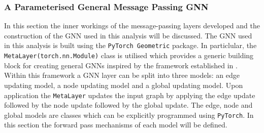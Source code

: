 \subsubsection{A Parameterised General Message Passing GNN}

In this section the inner workings of the message-passing layers developed and the construction of the GNN used in this analysis will be discussed. The GNN used in this analysis is built using the \texttt{PyTorch Geometric} package. In particlular, the \texttt{MetaLayer(torch.nn.Module)} class is utilised which provides a generic building block for creating general GNNs inspired by the framework established in \cite{https://doi.org/10.48550/arxiv.1806.01261}. Within this framework a GNN layer can be split into three models: an edge updating model, a node updating model and a global updating model. Upon application the \texttt{MetaLayer} updates the input graph by applying the edge update followed by the node update followed by the global update. The edge, node and global models are classes which can be explicitly programmed using \texttt{PyTorch}. In this section the forward pass mechanisms of each model will be defined.

